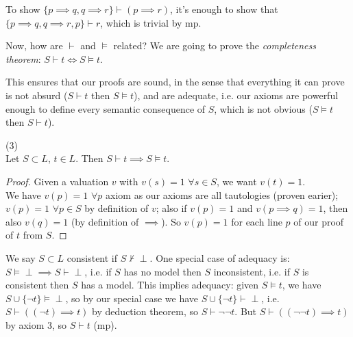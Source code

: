 \documentclass[a4paper]{article}
\begin{document}
\begin{eg}
To show $\{p \implies q, q \implies r\} \vdash (p \implies r)$, it's enough to show that $\{p \implies q, q \implies r, p\} \vdash r$, which is trivial by mp.
\end{eg}

Now, how are $\vdash$ and $\vDash$ related? We are going to prove the \emph{completeness theorem}: $S \vdash t \iff S \vDash t$.

This ensures that our proofs are sound, in the sense that everything it can prove is not absurd ($S \vdash t$ then $S \vDash t$), and are adequate, i.e. our axioms are powerful enough to define every semantic consequence of $S$, which is not obvious ($S \vDash t$ then $S \vdash t$).

\begin{prop} (3)\\
Let $S \subset L$, $t \in L$. Then $S \vdash t \implies S \vDash t$.
\begin{proof}
Given a valuation $v$ with $v(s) =1$ $\forall s \in S$, we want $v(t) = 1$.\\
We have $v(p) = 1$ $\forall p$ axiom as our axioms are all tautologies (proven earier); $v(p)=1$ $\forall p \in S$ by definition of $v$; also if $v(p) = 1$ and $v(p \implies q) = 1$, then also $v(q) = 1$ (by definition of $\implies$). So $v(p) = 1$ for each line $p$ of our proof of $t$ from $S$.
\end{proof}
\end{prop}

We say $S \subset L$ consistent if $S \not\vdash \perp$. One special case of adequacy is: $S \vDash \perp \implies S \vdash \perp$, i.e. if $S$ has no model then $S$ inconsistent, i.e. if $S$ is consistent then $S$ has a model. This implies adequacy: given $S \vDash t$, we have $S \cup \{\neg t\} \vDash \perp$, so by our special case we have $S \cup \{\neg t\} \vdash \perp$, i.e. $S \vdash ((\neg t) \implies t)$ by deduction theorem, so $S \vdash \neg\neg t$. But $S \vdash ((\neg\neg t) \implies t)$ by axiom 3, so $S \vdash t$ (mp).
\end{document}
